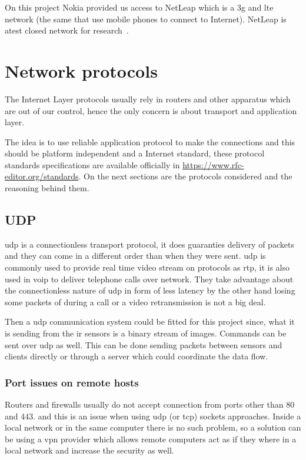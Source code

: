 \documentclass[hidelinks,11pt,a4paper,oneside,article]{memoir}
\begin{document}
On this project Nokia provided us access to NetLeap which is a \gls{3g} and \gls{lte} network (the same that use mobile phones to connect to Internet). NetLeap is atest closed network for research~\cite{netleap}.

\section{Network protocols}
The Internet Layer protocols usually rely in routers and other apparatus which are out of our control, hence the only concern is about transport and application layer.

The idea is to use reliable application protocol to make the connections and this should be platform independent and a Internet standard, these protocol standards specifications are available officially in \url{https://www.rfc-editor.org/standards}. On the next sections are the protocols considered and the reasoning behind them.


\subsection{UDP}
\gls{udp} is a connectionless transport protocol, it does guaranties delivery of packets and they can come in a different order than when they were sent.
\gls{udp} is commonly used to provide real time video stream on protocols as \gls{rtp}, it is also used in \gls{voip} to deliver telephone calls over network. They take advantage about the connectionless nature of \gls{udp} in form of less latency by the other hand losing some packets of during a call or a video retransmission is not a big deal. 

Then a \gls{udp} communication system could be fitted for this project since, what it is sending from the \gls{ir} sensors is a binary stream of images. Commands can be sent over \gls{udp} as well.
This can be done sending packets between sensors and clients directly or through a server which could coordinate the data flow.

\subsubsection{Port issues on remote hosts}\label{sec:port-issues-on-remote-hosts}
Routers and firewalls usually do not accept connection from ports other than 80 and 443. and this is an issue when using \gls{udp} (or \gls{tcp}) sockets approaches. Inside a local network or in the same computer there is no such problem, so a solution can be using a \gls{vpn} provider which allows remote computers act as if they where in a local network and increase the security as well.
\end{document}
